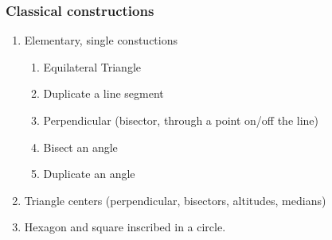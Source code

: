 \documentclass[12pt, twoside]{article}
\begin{document}
\subsubsection*{Classical constructions}
\begin{enumerate}
  \item Elementary, single constuctions
  \begin{enumerate}
    \item Equilateral Triangle
    \item Duplicate a line segment
    \item Perpendicular (bisector, through a point on/off the line)
    \item Bisect an angle
    \item Duplicate an angle
    \end{enumerate}
  \item Triangle centers (perpendicular, bisectors, altitudes, medians)
  \item Hexagon and square inscribed in a circle.
  \end{enumerate}
\end{document}
